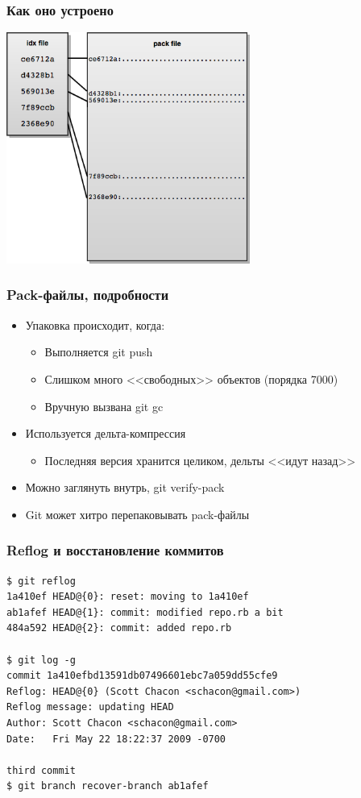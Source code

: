 \documentclass[xetex,mathserif,serif]{beamer}
\begin{document}
    \begin{frame}
        \frametitle{Как оно устроено}
        \begin{center}
            \includegraphics[width=0.6\textwidth]{gitPackFiles.png}
        \end{center}
    \end{frame}

    \begin{frame}
        \frametitle{Pack-файлы, подробности}
        \begin{itemize}
            \item Упаковка происходит, когда:
            \begin{itemize}
                \item Выполняется git push
                \item Слишком много <<свободных>> объектов (порядка 7000)
                \item Вручную вызвана git gc
            \end{itemize}
            \item Используется дельта-компрессия
            \begin{itemize}
                \item Последняя версия хранится целиком, дельты <<идут назад>>
            \end{itemize}
            \item Можно заглянуть внутрь, git verify-pack
            \item Git может хитро перепаковывать pack-файлы
        \end{itemize}
    \end{frame}

    \begin{frame}[fragile]
        \frametitle{Reflog и восстановление коммитов}
            \begin{verbatim}
$ git reflog
1a410ef HEAD@{0}: reset: moving to 1a410ef
ab1afef HEAD@{1}: commit: modified repo.rb a bit
484a592 HEAD@{2}: commit: added repo.rb

$ git log -g
commit 1a410efbd13591db07496601ebc7a059dd55cfe9
Reflog: HEAD@{0} (Scott Chacon <schacon@gmail.com>)
Reflog message: updating HEAD
Author: Scott Chacon <schacon@gmail.com>
Date:   Fri May 22 18:22:37 2009 -0700

third commit
$ git branch recover-branch ab1afef
            \end{verbatim}
    \end{frame}
\end{document}
